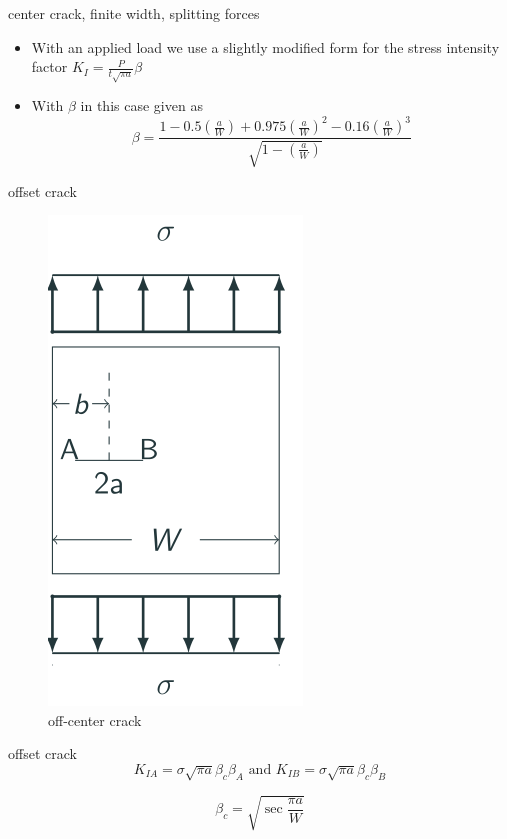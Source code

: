 \documentclass[
  letterpaper,
  ignorenonframetext,
  aspectratio=43,
  handout,
  12pt]{beamer}
\providecommand{\tightlist}{%
  \setlength{\itemsep}{0pt}\setlength{\parskip}{0pt}}
\providecommand{\tightlist}{%
\setlength{\itemsep}{0pt}\setlength{\parskip}{0pt}}
\let\Oldincludegraphics\includegraphics
\renewcommand{\includegraphics}[2][]{\Oldincludegraphics[width=\textwidth,height=0.7\textheight,keepaspectratio]{#2}}
\begin{document}
\begin{frame}{center crack, finite width, splitting forces}
\protect\hypertarget{center-crack-finite-width-splitting-forces-1}{}
\begin{itemize}
\tightlist
\item
  With an applied load we use a slightly modified form for the stress
  intensity factor \(K_I = \frac{P}{t \sqrt{\pi a}}\beta\)
\item
  With \(\beta\) in this case given as
  \[\beta = \frac{1 - 0.5\left(\frac{a}{W}\right)+0.975\left(\frac{a}{W}\right)^2 - 0.16\left(\frac{a}{W}\right)^3}{\sqrt{1-\left(\frac{a}{W}\right)}}\]
\end{itemize}
\end{frame}

\begin{frame}{offset crack}
\protect\hypertarget{offset-crack}{}
\begin{figure}
\centering
\includegraphics{../images/off-center.svg}
\caption{off-center crack}
\end{figure}
\end{frame}

\begin{frame}{offset crack}
\protect\hypertarget{offset-crack-1}{}
\[K_{IA} = \sigma \sqrt{\pi a} \beta_c \beta_A \text{ and } K_{IB} = \sigma \sqrt{\pi a} \beta_c \beta_B\]

\[ \beta_c = \sqrt{\sec \frac{\pi a}{W}}\]
\end{frame}
\end{document}
